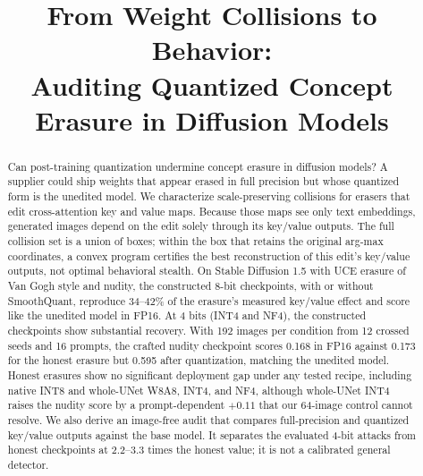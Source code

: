 \documentclass[conference]{IEEEtran}
\title{From Weight Collisions to Behavior:\\Auditing Quantized Concept Erasure in Diffusion Models}
\author{\IEEEauthorblockN{Anonymous Authors}}
\begin{document}
\maketitle

\begin{abstract}
Can post-training quantization undermine concept erasure in diffusion models?
A supplier could ship weights that appear erased in full precision but whose
quantized form is the unedited model. We characterize scale-preserving collisions
for erasers that edit cross-attention key and value maps. Because those maps see only
text embeddings, generated images depend on the edit solely through its key/value
outputs. The full collision set is a union of boxes; within the box that retains the
original arg-max coordinates, a convex program certifies the best reconstruction of
this edit's key/value outputs, not optimal behavioral stealth. On Stable Diffusion 1.5
with UCE erasure of Van Gogh style and nudity, the constructed 8-bit checkpoints,
with or without SmoothQuant, reproduce 34--42\% of the erasure's measured key/value
effect and score like the unedited model in FP16. At 4 bits (INT4 and NF4), the
constructed checkpoints show substantial recovery. With 192 images
per condition from 12 crossed seeds and 16 prompts, the crafted nudity checkpoint
scores 0.168 in FP16 against 0.173 for the honest erasure but 0.595 after
quantization, matching the unedited model. Honest erasures show no
significant deployment gap under any tested recipe, including native INT8 and
whole-UNet W8A8, INT4, and NF4, although whole-UNet INT4 raises the nudity score by a
prompt-dependent $+0.11$ that our 64-image control cannot resolve. We also derive an image-free audit that
compares full-precision and quantized key/value outputs against the base model. It
separates the evaluated 4-bit attacks from honest checkpoints at 2.2--3.3 times
the honest value; it is not a calibrated general detector.
\end{abstract}














\appendices

\end{document}
